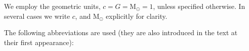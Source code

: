 \documentclass[
openright,
12pt, %
english,%
onehalfspacing, %
nolistspacing, %
nohyperref, %
headsepline, %
]{MastersDoctoralThesis} %
\def\Msun{{\text{M}_{\odot}}}
\begin{document}
\vspace{1.5cm}

We employ the geometric units, $c = G = \Msun = 1$, unless specified otherwise. 
In several cases we write $c$, and $\Msun$ explicitly for clarity. 

The following abbreviations are used (they are also introduced in the text 
at their first appearance):


%    


%    
%    
%    


%    
%    
%    
%    
\end{document}
